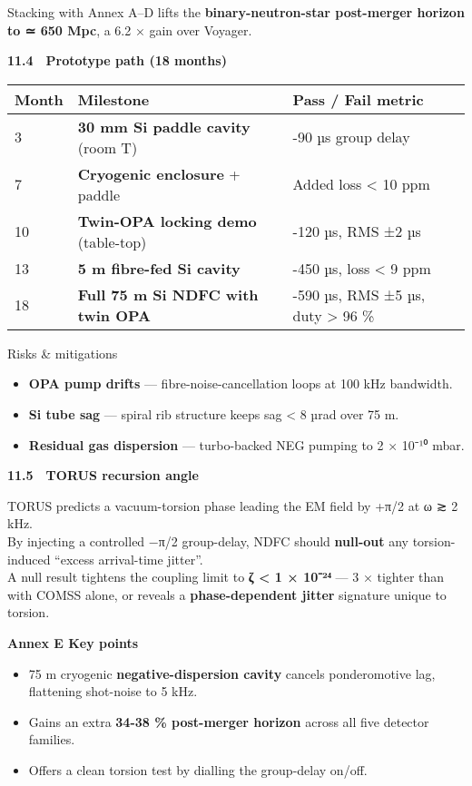 \documentclass[]{article}
\begin{document}
Stacking with Annex A--D lifts the \textbf{binary-neutron-star
post-merger horizon to ≃ 650 Mpc}, a 6.2 × gain over Voyager.

\textbf{11.4 Prototype path (18 months)}

\begin{longtable}[]{@{}lll@{}}
\toprule
\textbf{Month} & \textbf{Milestone} & \textbf{Pass / Fail
metric}\tabularnewline
\midrule
\endhead
3 & \textbf{30 mm Si paddle cavity} (room T) & -90 µs group
delay\tabularnewline
7 & \textbf{Cryogenic enclosure} + paddle & Added loss \textless{} 10
ppm\tabularnewline
10 & \textbf{Twin-OPA locking demo} (table-top) & -120 µs, RMS ±2
µs\tabularnewline
13 & \textbf{5 m fibre-fed Si cavity} & -450 µs, loss \textless{} 9
ppm\tabularnewline
18 & \textbf{Full 75 m Si NDFC with twin OPA} & -590 µs, RMS ±5 µs, duty
\textgreater{} 96 \%\tabularnewline
\bottomrule
\end{longtable}

Risks \& mitigations

\begin{itemize}
\item
  \textbf{OPA pump drifts} --- fibre-noise-cancellation loops at 100 kHz
  bandwidth.
\item
  \textbf{Si tube sag} --- spiral rib structure keeps sag \textless{} 8
  µrad over 75 m.
\item
  \textbf{Residual gas dispersion} --- turbo-backed NEG pumping to 2 ×
  10⁻¹⁰ mbar.
\end{itemize}

\textbf{11.5 TORUS recursion angle}

TORUS predicts a vacuum-torsion phase leading the EM field by +π/2 at ω
≳ 2 kHz.\\
By injecting a controlled −π/2 group-delay, NDFC should
\textbf{null-out} any torsion-induced ``excess arrival-time jitter''.\\
A null result tightens the coupling limit to \textbf{ζ \textless{} 1 ×
10⁻²⁴} --- 3 × tighter than with COMSS alone, or reveals a
\textbf{phase-dependent jitter} signature unique to torsion.

\textbf{Annex E Key points}

\begin{itemize}
\item
  75 m cryogenic \textbf{negative-dispersion cavity} cancels
  ponderomotive lag, flattening shot-noise to 5 kHz.
\item
  Gains an extra \textbf{34-38 \% post-merger horizon} across all five
  detector families.
\item
  Offers a clean torsion test by dialling the group-delay on/off.
\end{itemize}
\end{document}
